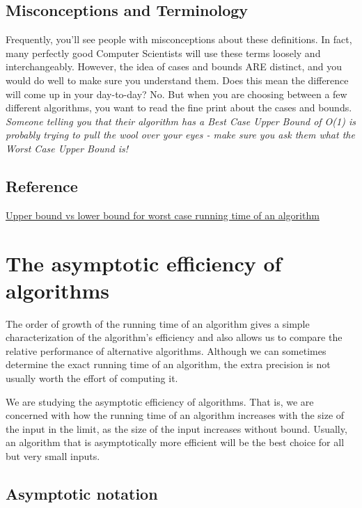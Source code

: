 \documentclass[en,hazy,blue,screen,14pt]{elegantnote}
\begin{document}
\subsection{Misconceptions and Terminology} 

Frequently, you'll see people with misconceptions about these definitions.
In fact, many perfectly good Computer Scientists will use these terms
loosely and interchangeably. However, the idea of cases and bounds
ARE distinct, and you would do well to make sure you understand them.
Does this mean the difference will come up in your day-to-day? No.
But when you are choosing between a few different algorithms, you
want to read the fine print about the cases and bounds. \emph{Someone
telling you that their algorithm has a Best Case Upper Bound of O(1)
is probably trying to pull the wool over your eyes - make sure you
ask them what the Worst Case Upper Bound is!}

\subsection{Reference}

\href{https://stackoverflow.com/questions/7628991/upper-bound-vs-lower-bound-for-worst-case-running-time-of-an-algorithm}{Upper bound vs lower bound for worst case running time of an algorithm}

\newpage

\section{The asymptotic efficiency of algorithms}

The order of growth of the running time of an algorithm gives a simple
characterization of the algorithm\textquoteright s efficiency and
also allows us to compare the relative performance of alternative
algorithms. Although we can sometimes determine the exact running
time of an algorithm, the extra precision is not usually worth the
effort of computing it. 

We are studying the asymptotic efficiency of algorithms. That is,
we are concerned with how the running time of an algorithm increases
with the size of the input in the limit, as the size of the input
increases without bound. Usually, an algorithm that is asymptotically
more efficient will be the best choice for all but very small inputs.

\subsection{Asymptotic notation }
\end{document}

